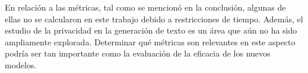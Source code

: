 En relación a las métricas, tal como se mencionó en la conclusión, algunas de ellas no se calcularon en este trabajo debido a restricciones de tiempo. Además, el estudio de la privacidad en la generación de texto es un área que aún no ha sido ampliamente explorada. Determinar qué métricas son relevantes en este aspecto podría ser tan importante como la evaluación de la eficacia de los nuevos modelos.

